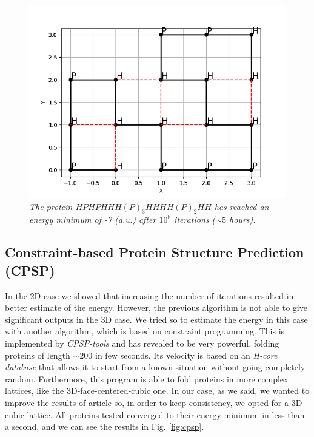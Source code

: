 \begin{figure}[H]
    \centering
    \includegraphics[width=.6\textwidth]{./img/18_2.png}
    \caption{\emph{The protein $HPHPHHH(P)_3HHHH(P)_2HH$ has reached an energy minimum of -7 (a.u.) after $10^8$ iterations ($\sim 5$ hours).}}
    \label{fig:18_2}
\end{figure}

\subsection{Constraint-based Protein Structure Prediction (CPSP)}
In the 2D case we showed that increasing the number of iterations resulted in better estimate of the energy.
However, the previous algorithm is not able to give significant outputs in the 3D case.
We tried so to estimate the energy in this case with another algorithm, which is based on constraint programming.
This is implemented by \emph{CPSP-tools} \cite{cpsp} and has revealed to be very powerful, folding proteins of length $\sim 200$ in few seconds.
Its velocity is based on an \emph{H-core database} that allows it to start from a known situation without going completely random.
Furthermore, this program is able to fold proteins in more complex lattices, like the 3D-face-centered-cubic one.
In our case, as we said, we wanted to improve the results of article \cite{PERM} so, in order to keep consistency, we opted for a 3D-cubic lattice.
All proteins tested converged to their energy minimum in less than a second, and we can see the results in Fig. \ref{fig:cpsp}.

